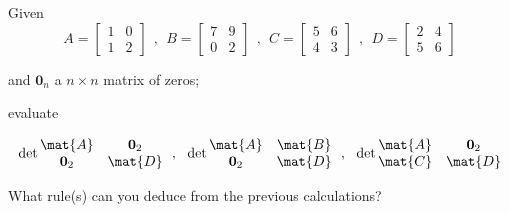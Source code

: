 \bexo
Given
\begin{equation}
	A = \begin{bmatrix}
		1& 0\\ 1& 2
	\end{bmatrix}
	~~,~~
	B = \begin{bmatrix}
		7& 9\\ 0& 2
	\end{bmatrix}
	~~,~~
	C = \begin{bmatrix}
		5& 6\\ 4& 3
	\end{bmatrix}
	~~,~~
	D = \begin{bmatrix}
		2& 4\\ 5& 6
	\end{bmatrix}
\end{equation}

and $\mathbf{0}_n$ a $n\times n$ matrix of zeros;

evaluate

\begin{equation}
\det{\begin{matrix}
	\mat{A}& \mathbf{0}_2\\
	\mathbf{0}_2 & \mat{D}\\
\end{matrix}}
~~,~~
\det{\begin{matrix}
	\mat{A}& \mat{B}\\
	\mathbf{0}_2 & \mat{D}\\
\end{matrix}}
~~,~~
\det{\begin{matrix}
	\mat{A}& \mathbf{0}_2\\
	\mat{C} & \mat{D}\\
\end{matrix}}
\end{equation}

What rule(s) can you deduce from the previous calculations?
\eexo


